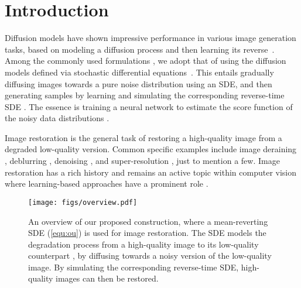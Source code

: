 \documentclass{article}
\theoremstyle{plain}
\theoremstyle{definition}
\theoremstyle{remark}
\begin{document}
\section{Introduction}
\label{section:introduction}

Diffusion models have shown impressive performance in various image generation tasks, based on modeling a diffusion process and then learning its reverse~\citep{sohl2015deep, ho2020denoising, song2019generative, song2020improved, song2021denoising, song2021maximum, song2021score, rombach2022high,rissanen2022generative}. Among the commonly used formulations \citep{yang2022diffusion}, we adopt that of using the diffusion models defined via stochastic differential equations~\citep[SDEs,][]{song2021maximum,song2021score}. This entails gradually diffusing images towards a pure noise distribution using an SDE, and then generating samples by learning and simulating the corresponding reverse-time SDE \citep{anderson1982reverse}. The essence is training a neural network to estimate the score function of the noisy data distributions \citep{song2019generative}.

Image restoration is the general task of restoring a high-quality image from a degraded low-quality version. Common specific examples include image deraining \citep{li2019single, ren2019progressive}, deblurring \citep{nah2017deep, zhang2020deblurring}, denoising \citep{zhang2017beyond, zhang2018ffdnet}, and super-resolution \citep{dong2015image, lugmayr2020srflow,luo2022deep}, just to mention a few.
Image restoration has a rich history \citep{hunt1973application, andrews1974digital, sezan1990survey, banham1997digital} and remains an active topic within computer vision where learning-based approaches have a prominent role \citep{zhang2017image, zhang2017learning, wang2022uformer, xiao2022stochastic}. 

\begin{figure*}[t]
    \begin{center}
    \centerline{\texttt{[image: figs/overview.pdf]}}\vspace{-2.0mm}
    \caption{An overview of our proposed construction, where a mean-reverting SDE (\ref{equ:ou}) is used for image restoration. The SDE models the degradation process from a high-quality image  to its low-quality counterpart , by diffusing  towards a noisy version  of the low-quality image. By simulating the corresponding reverse-time SDE, high-quality images can then be restored.}
    \label{fig:overview}
    \end{center}
    \vskip -0.2in
\end{figure*}
\end{document}
